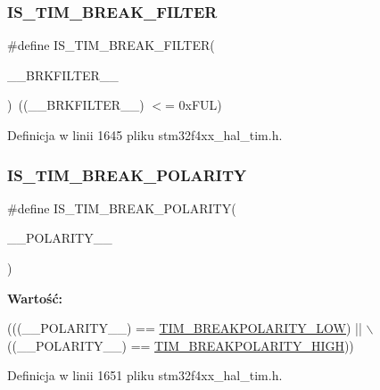 \subsubsection{\texorpdfstring{I\+S\+\_\+\+T\+I\+M\+\_\+\+B\+R\+E\+A\+K\+\_\+\+F\+I\+L\+T\+ER}{IS\_TIM\_BREAK\_FILTER}}
{\footnotesize\ttfamily \#define I\+S\+\_\+\+T\+I\+M\+\_\+\+B\+R\+E\+A\+K\+\_\+\+F\+I\+L\+T\+ER(\begin{DoxyParamCaption}\item[{}]{\+\_\+\+\_\+\+B\+R\+K\+F\+I\+L\+T\+E\+R\+\_\+\+\_\+ }\end{DoxyParamCaption})~((\+\_\+\+\_\+\+B\+R\+K\+F\+I\+L\+T\+E\+R\+\_\+\+\_\+) $<$= 0x\+F\+U\+L)}



Definicja w linii 1645 pliku stm32f4xx\+\_\+hal\+\_\+tim.\+h.

\mbox{\label{group___t_i_m___private___macros_ga42d1d6f041253c2a07ddee8d4411e2db}} 
\subsubsection{\texorpdfstring{I\+S\+\_\+\+T\+I\+M\+\_\+\+B\+R\+E\+A\+K\+\_\+\+P\+O\+L\+A\+R\+I\+TY}{IS\_TIM\_BREAK\_POLARITY}}
{\footnotesize\ttfamily \#define I\+S\+\_\+\+T\+I\+M\+\_\+\+B\+R\+E\+A\+K\+\_\+\+P\+O\+L\+A\+R\+I\+TY(\begin{DoxyParamCaption}\item[{}]{\+\_\+\+\_\+\+P\+O\+L\+A\+R\+I\+T\+Y\+\_\+\+\_\+ }\end{DoxyParamCaption})}

{\bfseries Wartość\+:}
\begin{DoxyCode}
(((\_\_POLARITY\_\_) == \hyperlink{group___t_i_m___break___polarity_ga3e07cb0376c1bf561341dc8befb66208}{TIM\_BREAKPOLARITY\_LOW}) || \(\backslash\)
                                             ((\_\_POLARITY\_\_) == 
      \hyperlink{group___t_i_m___break___polarity_ga97c30f1134accd61e3e42ce37e472700}{TIM\_BREAKPOLARITY\_HIGH}))
\end{DoxyCode}


Definicja w linii 1651 pliku stm32f4xx\+\_\+hal\+\_\+tim.\+h.

